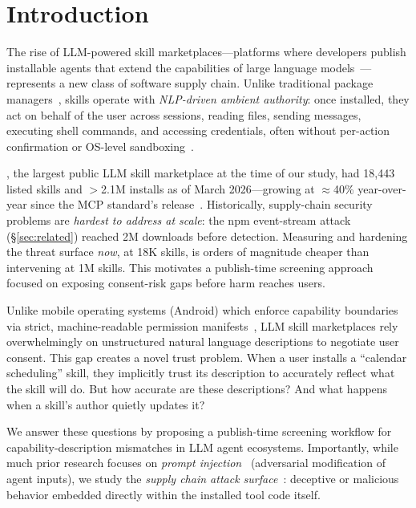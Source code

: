 
\section{Introduction}
\label{sec:introduction}

The rise of LLM-powered skill marketplaces---platforms where developers
publish installable agents that extend the capabilities of large language
models~\cite{xi2023rise,schick2024toolformer,yao2023react}---represents a new class of software supply chain.
Unlike traditional package managers~\cite{zimmermann2019small,duan2021measuring}, skills operate with
\emph{NLP-driven ambient authority}: once installed, they act on behalf of the user
across sessions, reading files, sending messages, executing shell commands,
and accessing credentials, often without per-action confirmation or OS-level sandboxing~\cite{ruan2024identifying}.

\clawhub{}, the largest public LLM skill marketplace at the time of our study,
had 18,443 listed skills and $>$2.1M installs as of March 2026---growing
at $\approx$40\% year-over-year since the MCP standard's release~\cite{anthropic2024mcp}.
Historically, supply-chain security problems are \emph{hardest to address at scale}:
the npm event-stream attack (\S\ref{sec:related}) reached 2M downloads before detection.
Measuring and hardening the threat surface \emph{now}, at 18K skills,
is orders of magnitude cheaper than intervening at 1M skills.
This motivates a publish-time screening approach focused on exposing
consent-risk gaps before harm reaches users.

Unlike mobile operating systems (\eg Android) which enforce capability boundaries
via strict, machine-readable permission manifests~\cite{felt2011android,au2012pscout}, LLM skill marketplaces rely
overwhelmingly on unstructured natural language descriptions to negotiate user consent.
This gap creates a novel trust problem.
When a user installs a ``calendar scheduling'' skill,
they implicitly trust its description to accurately reflect
what the skill will do.
But how accurate are these descriptions?
And what happens when a skill's author quietly updates it?

We answer these questions by proposing a publish-time screening workflow for capability-description mismatches in LLM agent ecosystems.
Importantly, while much prior research focuses on \emph{prompt injection}~\cite{greshake2023indirect}
(adversarial modification of agent inputs), we study the \emph{supply chain attack surface}~\cite{ohm2020backstabber,ladisa2023taxonomy}:
deceptive or malicious behavior embedded directly within the installed tool code itself.

